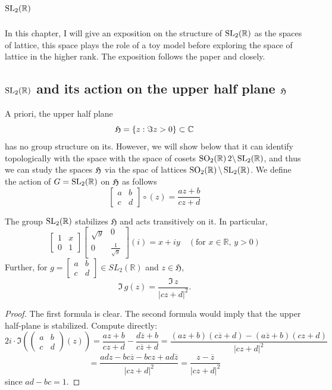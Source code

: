 \chapter{$\SL2$} %

In this chapter, I will give an exposition on the structure of $\SL2$ as the spaces of lattice, this space
plays the role of a toy model before exploring the space of lattice in the higher rank. The exposition follows
the paper \cite{} and  \cite{} closely.
\section{$\SL2$ and its action on the upper half plane $\operatorname{\mathfrak{H}}$}
A priori, the upper half plane
\[\operatorname{\mathfrak{H}} = \left\lbrace z: \Im z >0 \right\rbrace \subset \mathbb{C}\]
has no group structure on its. However, we will show below that it can identify topologically with the space
with the space of cosets $\SO22\backslash\SL2$, and thus we can study the spaces $\operatorname{\mathfrak{H}}$ via the spac of lattices $\SO2\backslash\SL2$.
We define the action of $G= \SL2$ on $\operatorname{\mathfrak{H}}$ as follows
\[
  \begin{bmatrix}a & b \\ c & d\end{bmatrix} \circ (z) = \frac{az + b}{cz + d}
\]
\begin{prop}\label{h-as-matrices}
  The group $\SL2$ stabilizes \(\mathfrak{H}\) and acts transitively on it. In particular,
  \[
    \begin{bmatrix}1 & x \\ 0 & 1\end{bmatrix}\begin{bmatrix}\sqrt{y} & 0 \\ 0 & \frac{1}{\sqrt{y}}\end{bmatrix}(i) = x + iy \quad (\text{for } x \in \mathbb{R}, \, y > 0)
  \]
  Further, for \(g = \begin{bmatrix}a & b \\ c & d\end{bmatrix} \in SL_{2}(\mathbb{R})\) and \(z \in \mathfrak{H}\),
  \[
    \text{$\Im$}\,g(z) = \frac{\text{$\Im$}\,z}{|cz + d|^2}.
  \]
\end{prop}
\begin{proof}
  The first formula is clear. The second formula would imply that the upper half-plane is stabilized. Compute directly:
  \[
    2i \cdot \text{$\Im$} \left( \begin{pmatrix} a & b \\ c & d \end{pmatrix} (z) \right) = \frac{az + b}{cz + d} - \frac{d\overline{z} + b}{c\overline{z} + d} = \frac{(az + b)(c\overline{z} + d) - (a\overline{z} + b)(cz + d)}{|cz + d|^2}
  \]
  \[
    = \frac{adz - bc\overline{z} - bcz + ad\overline{z}}{|cz + d|^2} = \frac{z - \overline{z}}{|cz + d|^2}
  \]
  since \( ad - bc = 1 \).
\end{proof}
